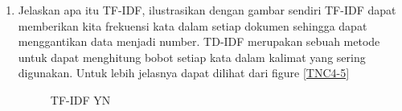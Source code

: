 \begin{enumerate}
\item Jelaskan apa itu TF-IDF, ilustrasikan dengan gambar sendiri
TF-IDF dapat memberikan kita frekuensi kata dalam setiap dokumen sehingga dapat menggantikan data menjadi number. TD-IDF merupakan sebuah metode untuk dapat menghitung bobot setiap kata dalam kalimat yang sering digunakan. Untuk lebih jelasnya dapat dilihat dari figure \ref{TNC4-5}

	\begin{figure}[ht]
		\caption{TF-IDF YN}
		\label{YNC4-5}
	\end{figure}


\end{enumerate}